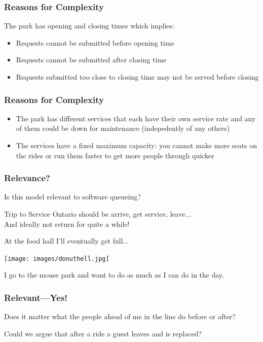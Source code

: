 \begin{frame}
\frametitle{Reasons for Complexity}


The park has opening and closing times which implies:
		\begin{itemize}
		\item Requests cannot be submitted before opening time
		\item Requests cannot be submitted after closing time
		\item Requests submitted too close to closing time may not be served before closing
		\end{itemize}


\end{frame}


\begin{frame}
\frametitle{Reasons for Complexity}

\begin{itemize}
	\item The park has different services that each have their own service rate and any of them could be down for maintenance (indepedently of any others) \vspace{5em}
	\item The services have a fixed maximum capacity: you cannot make more seats on the rides or run them faster to get more people through quicker
\end{itemize}


\end{frame}


\begin{frame}
\frametitle{Relevance?}

Is this model relevant to software queueing?

Trip to Service Ontario should be arrive, get service, leave...\\
\quad And ideally not return for quite a while!

At the food hall I'll eventually get full...

\begin{center}
	\texttt{[image: images/donuthell.jpg]}
\end{center}

I go to the mouse park and want to do as much as I can do in the day.

\end{frame}


\begin{frame}
\frametitle{Relevant---Yes!}

Does it matter what the people ahead of me in the line do before or after?

Could we argue that after a ride a guest leaves and is replaced?

\end{frame}


